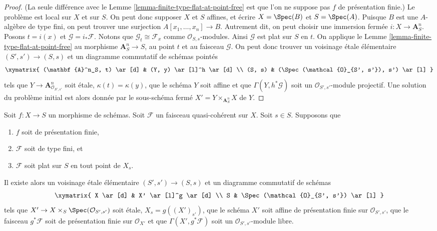 \begin{proof}
(La seule différence avec le
Lemme \ref{lemma-finite-type-flat-at-point-free}
est que l'on ne suppose pas $f$ de présentation finie.)
Le problème est local sur $X$ et sur $S$. On peut donc supposer $X$ et
$S$ affines, et écrire $X = \Spec(B)$ et $S = \Spec(A)$.
Puisque $B$ est une $A$-algèbre de type fini, on peut trouver une surjection
$A[x_1, \ldots, x_n] \to B$. Autrement dit, on peut choisir une immersion
fermée $i : X \to \mathbf{A}^n_S$. Posons $t = i(x)$ et
$\mathcal{G} = i_*\mathcal{F}$. Notons que $\mathcal{G}_t \cong \mathcal{F}_x$
comme $\mathcal{O}_{S, s}$-modules. Ainsi $\mathcal{G}$ est plat sur $S$ en $t$.
On applique
le Lemme \ref{lemma-finite-type-flat-at-point-free}
au morphisme $\mathbf{A}^n_S \to S$, au point $t$ et au
faisceau $\mathcal{G}$. On peut donc trouver un
voisinage \'etale élémentaire $(S', s') \to (S, s)$
et un diagramme commutatif de schémas pointés
$$
\xymatrix{
(\mathbf{A}^n_S, t) \ar[d] & (Y, y) \ar[l]^h \ar[d] \\
(S, s) & (\Spec(\mathcal{O}_{S', s'}), s') \ar[l]
}
$$
tels que $Y \to \mathbf{A}^n_{\mathcal{O}_{S', s'}}$
soit \'etale, $\kappa(t) = \kappa(y)$, que le schéma $Y$ soit
affine et que $\Gamma(Y, h^*\mathcal{G})$ soit un
$\mathcal{O}_{S', s'}$-module projectif. Une solution du problème
initial est alors donnée par le sous-schéma fermé
$X' = Y \times_{\mathbf{A}^n_S} X$ de $Y$.
\end{proof}

\begin{lemma}
\label{lemma-finite-type-flat-along-fibre-free}
Soit $f : X \to S$ un morphisme de schémas.
Soit $\mathcal{F}$ un faisceau quasi-cohérent sur $X$.
Soit $s \in S$.
Supposons que
\begin{enumerate}
\item $f$ soit de présentation finie,
\item $\mathcal{F}$ soit de type fini, et
\item $\mathcal{F}$ soit plat sur $S$ en tout point de $X_s$.
\end{enumerate}
Il existe alors un voisinage \'etale élémentaire $(S', s') \to (S, s)$
et un diagramme commutatif de schémas
$$
\xymatrix{
X \ar[d] & X' \ar[l]^g \ar[d] \\
S & \Spec(\mathcal{O}_{S', s'}) \ar[l]
}
$$
tels que $X' \to X \times_S \Spec(\mathcal{O}_{S', s'})$
soit \'etale, $X_s = g((X')_{s'})$, que le schéma $X'$ soit
affine de présentation finie sur $\mathcal{O}_{S', s'}$,
que le faisceau $g^*\mathcal{F}$ soit de présentation finie sur $\mathcal{O}_{X'}$
et que $\Gamma(X', g^*\mathcal{F})$ soit un
$\mathcal{O}_{S', s'}$-module libre.
\end{lemma}

